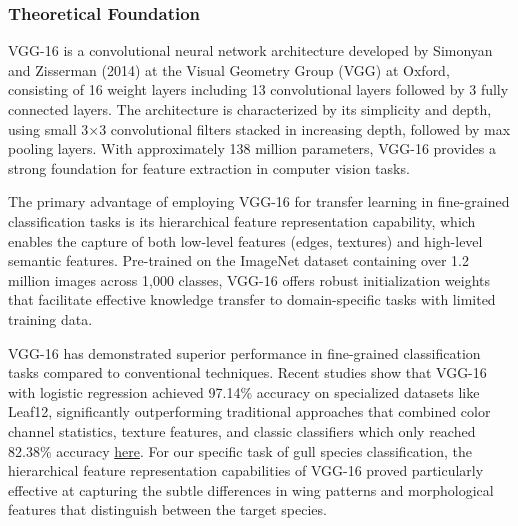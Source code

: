 \documentclass[a4paper,12pt]{report}
\begin{document}

\subsubsection{Theoretical Foundation}

VGG-16 is a convolutional neural network architecture developed by Simonyan and Zisserman (2014) at the Visual Geometry Group (VGG) at Oxford, consisting of 16 weight layers including 13 convolutional layers followed by 3 fully connected layers. The architecture is characterized by its simplicity and depth, using small 3×3 convolutional filters stacked in increasing depth, followed by max pooling layers. With approximately 138 million parameters, VGG-16 provides a strong foundation for feature extraction in computer vision tasks.

The primary advantage of employing VGG-16 for transfer learning in fine-grained classification tasks is its hierarchical feature representation capability, which enables the capture of both low-level features (edges, textures) and high-level semantic features. Pre-trained on the ImageNet dataset containing over 1.2 million images across 1,000 classes, VGG-16 offers robust initialization weights that facilitate effective knowledge transfer to domain-specific tasks with limited training data.

VGG-16 has demonstrated superior performance in fine-grained classification tasks compared to conventional techniques. Recent studies show that VGG-16 with logistic regression achieved 97.14\% accuracy on specialized datasets like Leaf12, significantly outperforming traditional approaches that combined color channel statistics, texture features, and classic classifiers which only reached 82.38\% accuracy \href{https://doi.org/10.3233/JIFS-169911}{here}. For our specific task of gull species classification, the hierarchical feature representation capabilities of VGG-16 proved particularly effective at capturing the subtle differences in wing patterns and morphological features that distinguish between the target species.
\end{document}
